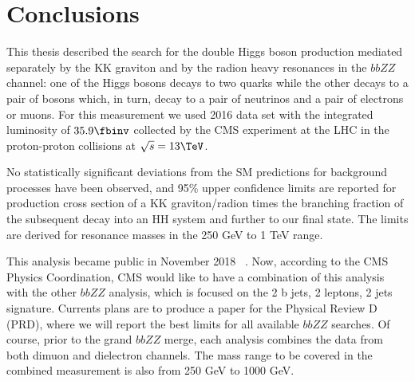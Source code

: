\chapter{Conclusions}
\label{ch:Conclusions}


This thesis described the search for the double Higgs boson production mediated separately by the KK graviton and by the radion heavy resonances in the $bbZZ$ channel: one of the Higgs bosons decays to
two \Pqb quarks while the other decays to a pair of \PZ bosons which, in
turn, decay to a pair of neutrinos and a pair of electrons or muons. For this measurement we used 2016 data set with the integrated luminosity of $35.9\fbinv$ collected by the CMS experiment at the LHC in the proton-proton collisions at $\sqrt{s} = 13 \TeV$.

No statistically significant deviations from the SM predictions for
background processes have been observed, and 95\% upper confidence limits are reported for production cross section
of a KK graviton/radion times the branching fraction of the subsequent decay into an
HH system and further to our final state. The limits are derived for resonance masses in the 250 GeV to 1 TeV range.

This analysis became public in November 2018 ~\cite{CMS-PAS-HIG-17-032}. Now, according to the CMS Physics Coordination, CMS would like to have a combination of this analysis with the other $bbZZ$ analysis, which is focused on the 2 b jets, 2 leptons, 2 jets signature. 
Currents plans are to produce a paper for the Physical Review D (PRD), where we will report the best limits for all available $bbZZ$ searches. Of course, prior to the grand $bbZZ$ merge, each analysis combines the data from both dimuon and dielectron channels. The mass range to be covered in the combined measurement is also from 250 GeV to 1000 GeV.

 

